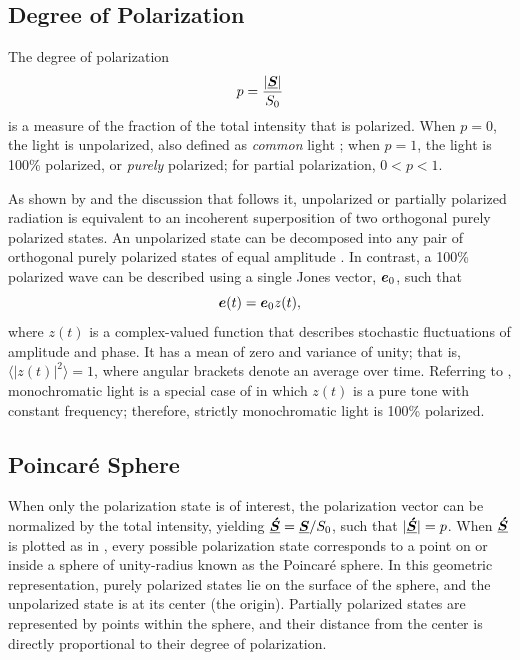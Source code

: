\subsection{Degree of Polarization}
\label{sec:degree_of_polarization}

The degree of polarization
%
\begin{equation}
\label{eqn:degree_of_polarization}
p = \frac{|\underline{\mbox{\boldmath $S$}}|}{S_0}
\end{equation}
%
is a measure of the fraction of the total intensity that is polarized.
%
When $p=0$, the light is unpolarized, also defined as \emph{common} light \citep{sto52};
when $p=1$, the light is 100\% polarized, or \emph{purely} polarized;
for partial polarization, $0 < p < 1$.
%

As shown by  and the discussion that follows it, unpolarized or partially polarized radiation is equivalent to an incoherent superposition of two orthogonal purely polarized states.
%
An unpolarized state can be decomposed into any pair of orthogonal purely polarized states of equal amplitude \citep{sto52}.
%
In contrast, a 100\% polarized wave can be described using a single Jones vector, $\mbox{\boldmath $e$}_0$,
such that
%
\begin{equation}
\label{eqn:pure_poln_e}
    \mbox{\boldmath $e$}(t) = \mbox{\boldmath $e$}_0 z(t),
\end{equation} 
%
where $z(t)$ is a complex-valued function that describes stochastic fluctuations of amplitude and phase.
%
It has a mean of zero and variance of unity; that is, $\langle|z(t)|^2\rangle = 1$, where angular brackets denote an average over time.
%
Referring to , monochromatic light is a special case of  in which $z(t)$ is a pure tone with constant frequency; therefore, strictly monochromatic light is 100\% polarized.

%
%

\subsection{Poincar\'{e} Sphere}
\label{sec:Poincare_sphere}

When only the polarization state is of interest, the polarization vector can be normalized by the total intensity, yielding $\underline{\mbox{\boldmath $\acute{S}$}} = \underline{\mbox{\boldmath $S$}}/S_0$, such that $|\underline{\mbox{\boldmath $\acute{S}$}}|=p$.
%
When $\underline{\mbox{\boldmath $\acute{S}$}}$ is plotted as in , 
every possible polarization state corresponds to a point on or inside a sphere of unity-radius known as the Poincar\'{e} sphere.
%
In this geometric representation, purely polarized states lie on the surface of the sphere, and the unpolarized state is at its center (the origin).
%
Partially polarized states are represented by points within the sphere, and their distance from the center is directly proportional to their degree of polarization.

